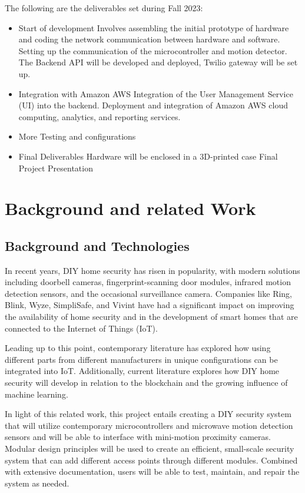 \documentclass[conference]{IEEEtran}
\begin{document}
The following are the deliverables set during Fall 2023:
\begin{itemize}
    \item Start of development
          \subitem Involves assembling the initial prototype of hardware and coding
          the network communication between hardware and software.
          \subitem Setting up the communication of the microcontroller and motion detector.
          \subitem The Backend API will be developed and deployed, Twilio gateway will be set up.
    \item Integration with Amazon AWS
          \subitem Integration of the User Management Service (UI) into the backend.
          \subitem Deployment and integration of Amazon AWS cloud computing,
          analytics, and reporting services.
    \item More Testing and configurations
    \item Final Deliverables
          \subitem Hardware will be enclosed in a 3D-printed case
          \subitem Final Project Presentation
\end{itemize}

\section{Background and related Work}

\subsection{Background and Technologies}

In recent years, DIY home security has risen in popularity, with modern solutions
including doorbell cameras, fingerprint-scanning door modules, infrared motion detection
sensors, and the occasional surveillance camera. Companies like Ring, Blink, Wyze,
SimpliSafe, and Vivint have had a significant impact on improving the availability of
home security and in the development of smart homes that are connected to the
Internet of Things (IoT).

Leading up to this point, contemporary literature has explored how using different parts
from different manufacturers in unique configurations can be integrated into IoT.\cite{sarhan2020}
Additionally, current literature explores how DIY home security will develop in relation
to the blockchain \cite{arifEtAl_2020} and the growing influence of machine learning.\cite{khanEtAl2021}

In light of this related work, this project entails creating a DIY security system
that will utilize contemporary microcontrollers and microwave motion detection sensors
and will be able to interface with mini-motion proximity cameras. Modular design
principles will be used to create an efficient, small-scale security system that can add
different access points through different modules. Combined with extensive documentation,
users will be able to test, maintain, and repair the system as needed.
\end{document}
